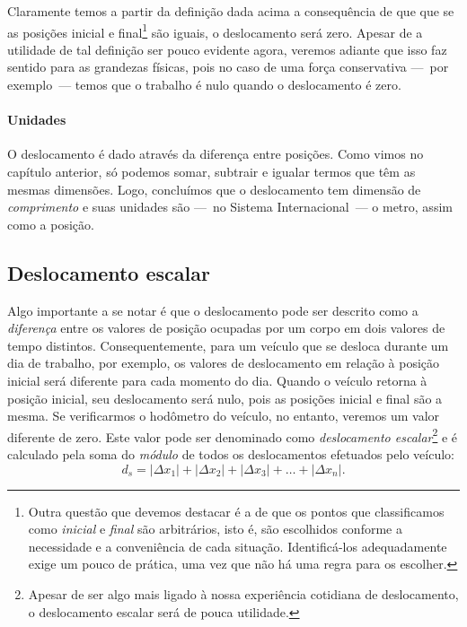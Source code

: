 Claramente temos a partir da definição dada acima a consequência de que que se as posições inicial e final\footnote{Outra questão que devemos destacar é a de que os pontos que classificamos como \emph{inicial} e \emph{final} são arbitrários, isto é, são escolhidos conforme a necessidade e a conveniência de cada situação. Identificá-los adequadamente exige um pouco de prática, uma vez que não há uma regra para os escolher.} são iguais, o deslocamento será zero. Apesar de a utilidade de tal definição ser pouco evidente agora, veremos adiante que isso faz sentido para as grandezas físicas, pois no caso de uma força conservativa ---~por exemplo~--- temos que o trabalho é nulo quando o deslocamento é zero.

\paragraph{Unidades}

O deslocamento é dado através da diferença entre posições. Como vimos no capítulo anterior, só podemos somar, subtrair e igualar termos que têm as mesmas dimensões. Logo, concluímos que o deslocamento tem dimensão de \emph{comprimento} e suas unidades são ---~no Sistema Internacional~--- o metro, assim como a posição.

\subsection{Deslocamento escalar}

Algo importante a se notar é que o deslocamento pode ser descrito como a \emph{diferença} entre os valores de posição ocupadas por um corpo em dois valores de tempo distintos. Consequentemente, para um veículo que se desloca durante um dia de trabalho, por exemplo, os valores de deslocamento em relação à posição inicial será diferente para cada momento do dia. Quando o veículo retorna à posição inicial, seu deslocamento será nulo, pois as posições inicial e final são a mesma. Se verificarmos o hodômetro do veículo, no entanto, veremos um valor diferente de zero. Este valor pode ser denominado como \emph{deslocamento escalar}\footnote{Apesar de ser algo mais ligado à nossa experiência cotidiana de deslocamento, o deslocamento escalar será de pouca utilidade.} e é calculado pela soma do \emph{módulo} de todos os deslocamentos efetuados pelo veículo:
\begin{equation}
  d_s = |\Delta x_1| + |\Delta x_2| + |\Delta x_3| + \dots + |\Delta x_n|.
\end{equation}

